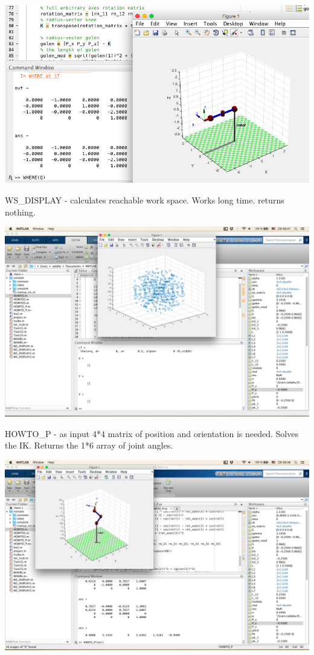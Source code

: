 \documentclass[12pt]{article}
\begin{document}
\begin{center}
  \includegraphics[width=15cm]{where}
\end{center}

WS\_DISPLAY - calculates reachable work space. Works long time. returns nothing. 

\begin{center}
  \includegraphics[width=15cm]{ws}
\end{center}

\newpage

HOWTO\_P - as input 4*4 matrix of position and orientation is needed. Solves the IK. Returns the 1*6 array of joint angles.

\begin{center}
  \includegraphics[width=15cm]{ht}
\end{center}
\end{document}
